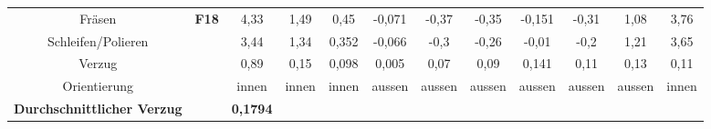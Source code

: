 \documentclass[12pt,a4paper,parskip,twoside,BCOR5mm,headsepline]{scrartcl}
\begin{document}
\begin{description*}
\begin{table}
\begin{tabular}{cccccccccccc}
\midrule
 Fräsen& \textbf{F18} &4,33  & 1,49 &0,45  & -0,071 &-0,37  &-0,35  &-0,151  & -0,31 &1,08 &3,76  \\
Schleifen/Polieren &&3,44 &1,34 &0,352  &-0,066  & -0,3 &-0,26  &-0,01  &-0,2 &1,21 &3,65  \\
Verzug && 0,89 &0,15  &0,098  & 0,005 &0,07 &0,09  &0,141 &0,11  &0,13 & 0,11 \\
Orientierung &&innen  &innen  &innen &aussen  &aussen  &aussen  & aussen &aussen  & aussen &innen \\
\textbf{Durchschnittlicher Verzug} && \textbf{0,1794} &&&&&&&&&\\
\bottomrule

















\end{tabular}
\end{table}












\newpage


















\newpage




  
 

\end{description*}
\end{document}
